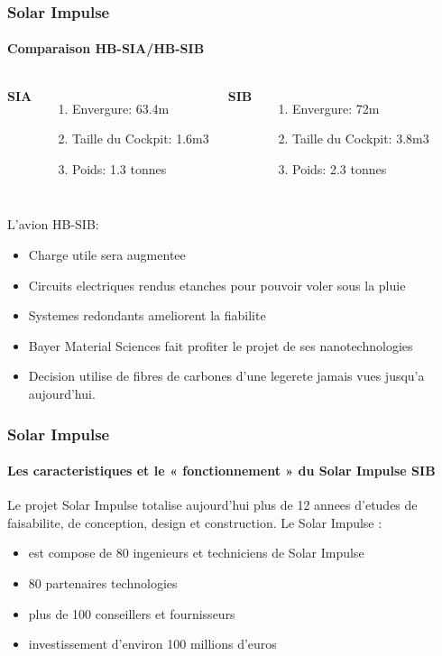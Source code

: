 \documentclass{beamer}
\begin{document}

\begin{frame}
\frametitle{Solar Impulse}
\framesubtitle{Comparaison HB-SIA/HB-SIB}

\begin{columns}[c] %

\textbf{SIA}
\begin{enumerate}
\item Envergure: 63.4m
\item Taille du Cockpit: 1.6m3
\item Poids: 1.3 tonnes
\end{enumerate}

\textbf{SIB}
\begin{enumerate}
\item Envergure: 72m
\item Taille du Cockpit: 3.8m3
\item Poids: 2.3 tonnes
\end{enumerate}

\end{columns}

L'avion HB-SIB:
\begin{itemize}
\item Charge utile sera augmentee
\item Circuits electriques rendus etanches pour pouvoir voler sous la pluie
\item Systemes redondants ameliorent la fiabilite
\item Bayer Material Sciences fait profiter le projet de ses nanotechnologies 
\item Decision utilise de fibres de carbones d'une legerete jamais vues jusqu'a aujourd'hui.
\end{itemize}
\end{frame}




\begin{frame}
\frametitle{Solar Impulse}
\framesubtitle{Les caracteristiques et le  « fonctionnement » du Solar Impulse SIB}

Le projet Solar Impulse totalise aujourd'hui plus de 12 annees d'etudes de faisabilite, de conception, design et construction. Le Solar Impulse :\\

\begin{itemize}
\item est compose de 80 ingenieurs et techniciens de Solar Impulse
\item 80 partenaires technologies
\item plus de 100 conseillers et fournisseurs
\item investissement d'environ 100 millions d'euros


\end{itemize}

\end{frame}
\end{document}
